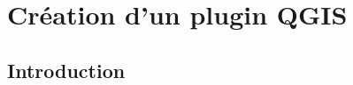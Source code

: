\documentclass[11pt]{article}
\begin{document}
\hrulefill
\vspace*{1.6em}

\hrulefill
\vspace*{1.6em}

\hrulefill
\vspace*{1.6em}

\hrulefill
\vspace*{1.6em}

\hrulefill
\vspace*{1.6em}

\hrulefill
\vspace*{1.6em}

\hrulefill
\vspace*{1.6em}

\hrulefill
\vspace*{1.6em}

\hrulefill
\vspace*{1.6em}





\cleardoublepage{}
\newpage{}


\section{Création d'un plugin QGIS}
\label{Plugin}


\subsection{Introduction}
\label{IntroPlugin}
\end{document}
